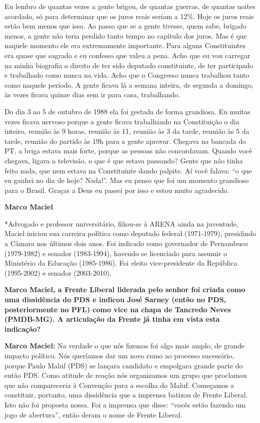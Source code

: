 Eu lembro de quantas vezes a gente brigou, de quantas guerras, de
quantas noites acordado, só para determinar que os juros reais seriam a
12\%. Hoje os juros reais estão bem menos que isso. Ao passo que se a
gente tivesse, quem sabe, brigado menos, a gente não teria perdido tanto
tempo no capítulo dos juros. Mas é que naquele momento ele era
extremamente importante. Para alguns Constituintes era quase que sagrado
e eu confesso que valeu a pena. Acho que eu vou carregar na minha
biografia o direito de ter sido deputado constituinte, de ter
participado e trabalhado como nunca na vida. Acho que o Congresso nunca
trabalhou tanto como naquele período. A gente ficava lá a semana
inteira, de segunda a domingo, às vezes ficava quinze dias sem ir para
casa, trabalhando.

Do dia 3 ao 5 de outubro de 1988 ela foi gestada de forma grandiosa. Eu
muitas vezes ficava nervoso porque a gente ficava trabalhando na
Constituição o dia inteiro, reunião às 9 horas, reunião às 11, reunião
às 3 da tarde, reunião às 5 da tarde, reunião do partido às 19h para a
gente aprovar. Chegava na bancada do PT, a briga estava mais forte,
porque as pessoas não concordavam. Quando você chegava, ligava a
televisão, o que é que estava passando? Gente que não tinha feito nada,
que nem estava na Constituinte dando palpite. Aí você falava: ``o que eu
ganhei no dia de hoje? Nada!''. Mas eu penso que foi um momento
grandioso para o Brasil. Graças a Deus eu passei por isso e estou muito
agradecido.

\textbf{Marco Maciel}

*Advogado e professor universitário, filiou-se à ARENA ainda na
juventude, Maciel iniciou sua carreira política como deputado federal
(1971-1979), presidindo a Câmara nos últimos dois anos. Foi indicado
como governador de Pernambuco (1979-1982) e senador (1983-1994), havendo
se licenciado para assumir o Ministério da Educação (1985-1986). Foi
eleito vice-presidente da República (1995-2002) e senador (2003-2010).

\textbf{Marco Maciel, a Frente Liberal liderada pelo senhor foi criada
como uma dissidência do PDS e indicou José Sarney (então no PDS,
posteriormente no PFL) como vice na chapa de Tancredo Neves (PMDB-MG). A
articulação da Frente já tinha em vista esta indicação?}

\textbf{Marco Maciel:} Na verdade o que nós fizemos foi algo mais amplo,
de grande impacto político. Nós queríamos dar um novo rumo ao processo
sucessório, porque Paulo Maluf (PDS) se lançara candidato e empolgara
grande parte do então PDS. Como atitude de reação nós organizamos um
grupo que proclamou que não compareceria à Convenção para a escolha do
Maluf. Começamos a constituir, portanto, uma dissidência que a imprensa
batizou de Frente Liberal. Isto não foi proposta nossa. Foi a imprensa
que disse: ``vocês estão fazendo um jogo de abertura'', então deram o
nome de Frente Liberal.

